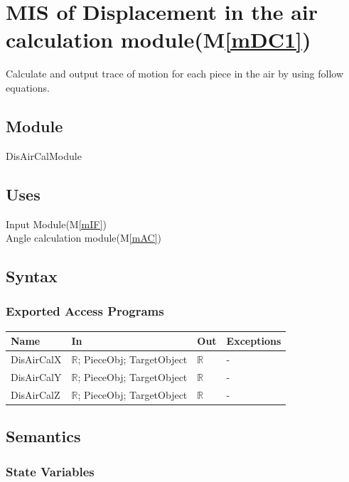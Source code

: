 \documentclass[12pt, titlepage]{article}
\newcommand{\mref}[1]{M\ref{#1}}
\begin{document}
\section{MIS of Displacement in the air calculation module(\mref{mDC1})}

Calculate and output trace of motion for each piece in the air by using follow equations.\\

\subsection{Module}

DisAirCalModule

\subsection{Uses}

Input Module(\mref{mIF})\\
Angle calculation module(\mref{mAC})\\

\subsection{Syntax}

\subsubsection{Exported Access Programs}

\begin{center}
	\begin{tabular}{p{2cm} p{4cm} p{4cm} p{2cm}}
		\hline
		\textbf{Name} & \textbf{In} & \textbf{Out} & \textbf{Exceptions} \\
		\hline
		DisAirCalX & $\mathbb{R}$; PieceObj; TargetObject & $\mathbb{R}$ & - \\
		DisAirCalY & $\mathbb{R}$; PieceObj; TargetObject & $\mathbb{R}$ & - \\
		DisAirCalZ & $\mathbb{R}$; PieceObj; TargetObject & $\mathbb{R}$ & - \\
		\hline
	\end{tabular}
\end{center}

\subsection{Semantics}

\subsubsection{State Variables}
\end{document}
